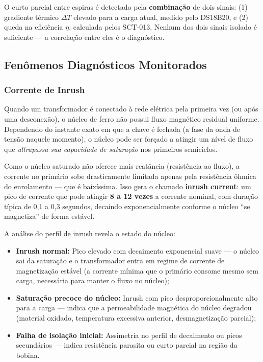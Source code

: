 \documentclass[12pt, a4paper]{article}
\begin{document}
\begin{tcolorbox}[caixaAlerta, title={Sinal Diagnóstico Combinado}]
O curto parcial entre espiras é detectado pela \textbf{combinação} de dois sinais: (1) gradiente térmico $\Delta T$ elevado para a carga atual, medido pelo DS18B20, e (2) queda na eficiência $\eta$, calculada pelos SCT-013. Nenhum dos dois sinais isolado é suficiente --- a correlação entre eles é o diagnóstico.
\end{tcolorbox}

\subsection{Fenômenos Diagnósticos Monitorados}
\label{sec:fenomenos}

\subsubsection{Corrente de Inrush}
\label{subsec:inrush}

Quando um transformador é conectado à rede elétrica pela primeira vez (ou após uma desconexão), o núcleo de ferro não possui fluxo magnético residual uniforme. Dependendo do instante exato em que a chave é fechada (a fase da onda de tensão naquele momento), o núcleo pode ser forçado a atingir um nível de fluxo que \emph{ultrapassa sua capacidade de saturação} nos primeiros semiciclos.

Como o núcleo saturado não oferece mais reatância (resistência ao fluxo), a corrente no primário sobe drasticamente limitada apenas pela resistência ôhmica do enrolamento --- que é baixíssima. Isso gera o chamado \textbf{inrush current}: um pico de corrente que pode atingir \textbf{8 a 12 vezes} a corrente nominal, com duração típica de 0,1 a 0,3 segundos, decaindo exponencialmente conforme o núcleo ``se magnetiza'' de forma estável.

A análise do perfil de inrush revela o estado do núcleo:

\begin{itemize}[leftmargin=2cm]
    \item \textbf{Inrush normal:} Pico elevado com decaimento exponencial suave --- o núcleo sai da saturação e o transformador entra em regime de corrente de magnetização estável (a corrente mínima que o primário consome mesmo sem carga, necessária para manter o fluxo no núcleo);
    \item \textbf{Saturação precoce do núcleo:} Inrush com pico desproporcionalmente alto para a carga --- indica que a permeabilidade magnética do núcleo degradou (material oxidado, temperatura excessiva anterior, desmagnetização parcial);
    \item \textbf{Falha de isolação inicial:} Assimetria no perfil de decaimento ou picos secundários --- indica resistência parasita ou curto parcial na região da bobina.
\end{itemize}
\end{document}
